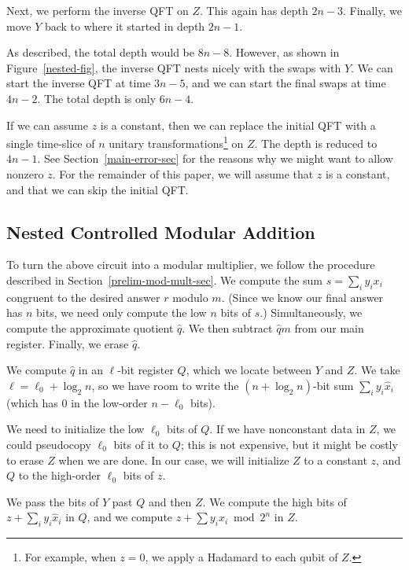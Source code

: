 \documentclass{article} %
\newcommand{\caps}[1]{{\sc #1}}
\newcommand{\QFT}{\caps{QFT}\xspace}
\begin{document}
Next, we perform the inverse \QFT on $Z$.  This again has depth $2n-3$.
Finally, we move $Y$ back to where it started in depth $2n - 1$.

As described, the total depth would be $8n - 8$.  However, as shown
in Figure~\ref{nested-fig}, the inverse \QFT nests nicely with the
swaps with $Y$.  We can start the inverse \QFT at time $3n - 5$, and
we can start the final swaps at time $4n-2$.  The total depth is only
$6n - 4$.

If we can assume $z$ is a constant, then we can replace the initial {\QFT}
with a single time-slice of $n$ unitary transformations\footnote{For
example, when $z = 0$, we apply a Hadamard to each qubit of $Z$.} on $Z$.
The depth is reduced to $4n - 1$.  See Section~\ref{main-error-sec} for
the reasons
why we might want to allow nonzero $z$.  For the remainder of this paper,
we will assume that $z$ is a constant, and that we can skip the initial {\QFT}.

\subsection{Nested Controlled Modular Addition}
\label{main-mod-mult-sec}

To turn the above circuit into a modular multiplier, we follow the
procedure described in Section~\ref{prelim-mod-mult-sec}.  We
compute the sum $s = \sum_i y_i x_i$ congruent to the desired
answer $r$ modulo $m$.  (Since we know our final answer has $n$ bits, we
need only compute the low $n$ bits of $s$.)
Simultaneously, we compute the approximate
quotient $\hat{q}$.  We then subtract $\hat{q}m$ from our main register.
Finally, we erase $\hat{q}$.

We compute $\hat{q}$ in an $\ell$-bit register $Q$, which we
locate between $Y$ and $Z$.  We take $\ell = \ell_0 + \log_2 n$, so
we have room to write the $(n + \log_2 n)$-bit sum $\sum_i y_i \hat{x}_i$
(which has $0$ in the low-order $n - \ell_0$ bits).

We need to initialize the low $\ell_0$ bits of $Q$.  If we have
nonconstant data in $Z$, we could pseudocopy
$\ell_0$ bits of it to $Q$; this is
not expensive, but it might be costly to erase $Z$ when we are done.
In our case, we will initialize $Z$ to a constant $z$, and $Q$
to the high-order $\ell_0$ bits of $z$.

We pass the bits of $Y$ past $Q$ and
then $Z$.  We compute the high bits of $z + \sum_i y_i \hat{x}_i$ in $Q$,
and we compute $z + \sum y_i x_i \bmod 2^n$ in $Z$.  
\end{document}
